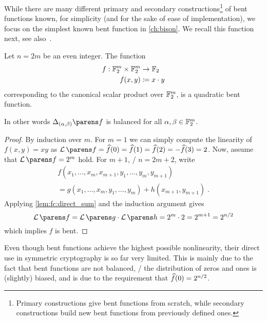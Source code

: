 While there are many different primary and secondary constructions\footnote{%
    Primary constructions give bent functions from scratch, while secondary constructions build new bent functions from previously defined ones.
} of bent functions known, for simplicity (and for the sake of ease of implementation), we focus on the simplest known bent function in \cref{ch:bison}.
We recall this function next, see also~.
\begin{lemma}\label{lem:inner-product-bent}
    Let $n = 2 m$ be an even integer.
    The function
    \begin{align*}
        f : \mathbb{F}_2^m \times \mathbb{F}_2^m &\to \mathbb{F}_2 \\
        f(x,y) &\coloneqq x \cdot y
    \end{align*}
    corresponding to the canonical scalar product over $\mathbb{F}_2^m$, is a quadratic bent function.

    In other words $\derive{(\alpha, \beta)}{f}$ is balanced for all $\alpha, \beta \in \mathbb{F}_2^m$.
\end{lemma}
\begin{proof}
    By induction over $m$.
    For $m=1$ we can simply compute the linearity of $f(x,y) = xy$ as $\linearity{f} = \FC{f}(0) = \FC{f}(1) = \FC{f}(2) = -\FC{f}(3) = 2$.
    Now, assume that $\linearity{f} = 2^m$ hold.
    For $m+1$, \ie/ $n = 2m + 2$, write
    \begin{gather*}
        f(x_1, \ldots, x_m, x_{m+1}, y_1, \ldots, y_m, y_{m+1}) \\
        = g(x_1, \ldots, x_m, y_1, \ldots, y_m) + h(x_{m+1}, y_{m+1})\;.
    \end{gather*}
    Applying \cref{lem:fc:direct_sum} and the induction argument gives
    \begin{equation*}
        \linearity{f} = \linearity{g} \cdot \linearity{h} = 2^m \cdot 2 = 2^{m+1} = 2^{n/2}
    \end{equation*}
    which implies $f$ is bent.
\end{proof}

Even though bent functions achieve the highest possible nonlinearity, their direct use in symmetric cryptography is so far very limited.
This is mainly due to the fact that bent functions are not balanced, \ie/ the distribution of zeros and ones is (slightly) biased, and is due to the requirement that $\widehat{f}(0) = 2^{n/2}$.

